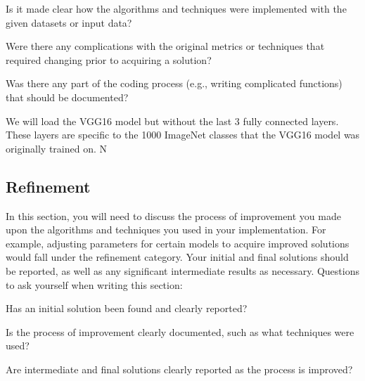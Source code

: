 \documentclass[12pt,journal,compsoc]{IEEEtran}
\begin{document}
Is it made clear how the algorithms and techniques were implemented with the given datasets or input data?

Were there any complications with the original metrics or techniques that required changing prior to acquiring a solution?

Was there any part of the coding process (e.g., writing complicated functions) that should be documented?

We will load the VGG16 model but without the last 3 fully connected layers.  These layers are specific to the 1000 ImageNet classes that the VGG16 model was originally trained on.  N

\subsection{Refinement}
In this section, you will need to discuss the process of improvement you made upon the algorithms and techniques you used in your implementation. For example, adjusting parameters for certain models to acquire improved solutions would fall under the refinement category. Your initial and final solutions should be reported, as well as any significant intermediate results as necessary. Questions to ask yourself when writing this section:

Has an initial solution been found and clearly reported?

Is the process of improvement clearly documented, such as what techniques were used?

Are intermediate and final solutions clearly reported as the process is improved?




\end{document}
